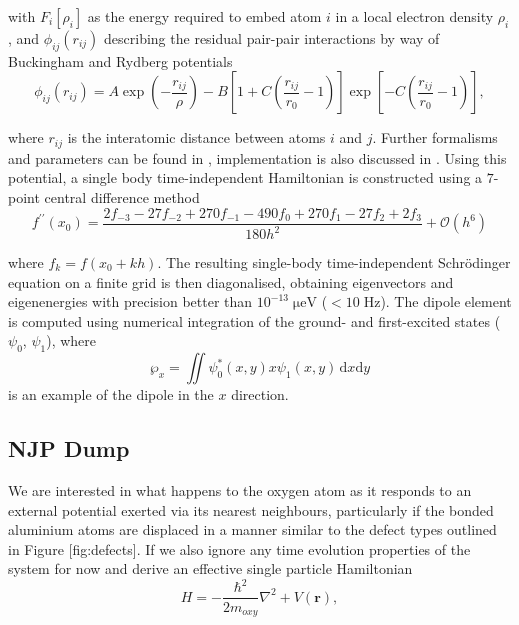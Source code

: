 with $F_{i}\left[\rho_i\right]$ as the energy required to embed atom $i$ in a local electron density $\rho_i$, and $\phi_{ij}(r_{ij})$ describing the residual pair-pair interactions by way of Buckingham and Rydberg potentials
\begin{equation}
\phi_{ij}(r_{ij}) = A\exp\left(-\frac{r_{ij}}{\rho}\right)-B\left[1+C\left(\frac{r_{ij}}{r_0}-1\right)\right]\exp\left[-C\left(\frac{r_{ij}}{r_0}-1\right)\right],
\end{equation}

where $r_{ij}$ is the interatomic distance between atoms $i$ and $j$.
Further formalisms and parameters can be found in , implementation is also discussed in .
Using this potential, a single body time-independent Hamiltonian is constructed using a $7$-point central difference method
\begin{equation}
f^{\prime\prime}(x_0)=\frac{2f_{-3}-27f_{-2}+270f_{-1}-490f_{0}+270f_{1}-27f_{2}+2f_{3}}{180h^{2}}+\mathcal{O}(h^{6})
\end{equation}

where $f_k=f\left(x_0+kh\right)$.
The resulting single-body time-independent Schr\"odinger equation on a finite grid is then diagonalised, obtaining eigenvectors and eigenenergies with precision better than $10^{-13} \; \mathrm{\mu eV}$ ($< 10 \; \mathrm{Hz}$).
The dipole element is computed using numerical integration of the ground- and first-excited states ($\psi_0$, $\psi_1$), where
\begin{equation}
    \wp_x = \iint \psi_0^*(x,y) x \psi_1(x,y) \,\mathrm{d}x\mathrm{d}y
\end{equation}
is an example of the dipole in the $x$ direction.

\subsection{NJP Dump}
We are interested in what happens to the oxygen atom as it responds to an external potential exerted via its nearest neighbours, particularly if the bonded aluminium atoms are displaced in a manner similar to the defect types outlined in Figure [fig:defects].
If we also ignore any time evolution properties of the system for now and derive an effective single particle Hamiltonian
\begin{equation}
    H = -\frac{\hbar^2}{2m_{oxy}}\nabla^2+V(\mathbf{r}),
\end{equation}

